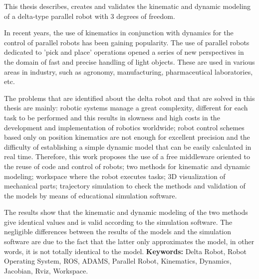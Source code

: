 \thispagestyle{fancy}

\vspace{5mm}

This thesis describes, creates and validates the kinematic and dynamic modeling of a delta-type parallel robot with 3 degrees of freedom.

In recent years, the use of kinematics in conjunction with dynamics for the control of parallel robots has been gaining popularity. The use of parallel robots dedicated to 'pick and place' operations opened a series of new perspectives in the domain of fast and precise handling of light objects. These are used in various areas in industry, such as agronomy, manufacturing, pharmaceutical laboratories, etc. 

The problems that are identified about the delta robot and that are solved in this thesis are mainly: robotic systems manage a great complexity, different for each task to be performed and this results in slowness and high costs in the development and implementation of robotics worldwide; robot control schemes based only on position kinematics are not enough for excellent precision and the difficulty of establishing a simple dynamic model that can be easily calculated in real time. Therefore, this work proposes the use of a free middleware oriented to the reuse of code and control of robots; two methods for kinematic and dynamic modeling; workspace where the robot executes tasks; 3D visualization of mechanical parts; trajectory simulation to check the methods and validation of the models by means of educational simulation software.

The results show that the kinematic and dynamic modeling of the two methods give identical values and is valid according to the simulation software. The negligible differences between the results of the models and the simulation software are due to the fact that the latter only approximates the model, in other words, it is not totally identical to the model.
\vfill
\noindent\textbf{Keywords:} Delta Robot, Robot Operating System, ROS, ADAMS, Parallel Robot, Kinematics, Dynamics, Jacobian, Rviz, Workspace. 
